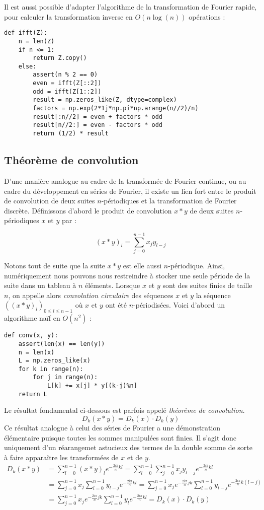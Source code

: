 \documentclass{article}
\begin{document}
Il est aussi possible d'adapter l'algorithme de la transformation de Fourier rapide, pour calculer la transformation inverse en $O(n\log(n))$ opérations :
\begin{verbatim}
def ifft(Z):
    n = len(Z)
    if n <= 1:
        return Z.copy()
    else:
        assert(n % 2 == 0)
        even = ifft(Z[::2])
        odd = ifft(Z[1::2])
        result = np.zeros_like(Z, dtype=complex)
        factors = np.exp(2*1j*np.pi*np.arange(n//2)/n)
        result[:n//2] = even + factors * odd
        result[n//2:] = even - factors * odd
        return (1/2) * result
\end{verbatim}
\subsection{Théorème de convolution}

D'une manière analogue au cadre de la transformée de Fourier continue, ou au cadre du développement en séries de Fourier, il existe un lien fort entre le produit de convolution de deux suites $n$-périodiques et la transformation de Fourier discrète. Définissons d'abord le produit de convolution $x*y$ de deux suites $n$-périodiques $x$ et $y$ par :

$$(x*y)_l = \sum_{j=0}^{n-1}x_j y_{l-j}$$

Notons tout de suite que la suite $x*y$ est elle aussi $n$-périodique. Ainsi, numériquement nous pouvons nous restreindre à stocker une seule période de la suite dans un tableau à $n$ éléments.   
Lorsque $x$ et $y$ sont des suites finies de taille $n$, on appelle alors \emph{convolution circulaire} des séquences $x$ et $y$ la séquence $((x*y)_l)_{0 \le l \le n-1}$ où $x$ et $y$ ont été $n$-périodisées. Voici d'abord un algorithme naïf en $O(n^2)$ :
\begin{verbatim}
def conv(x, y):
    assert(len(x) == len(y))
    n = len(x)
    L = np.zeros_like(x)
    for k in range(n):
        for j in range(n):
            L[k] += x[j] * y[(k-j)%n]
    return L
\end{verbatim}

Le résultat fondamental ci-dessous est parfois appelé \emph{théorème de convolution}.
\begin{equation}
  \label{conv}
  D_k(x*y) = D_k(x) \cdot D_k(y)
\end{equation}
Ce résultat analogue à celui des séries de Fourier a une démonstration élémentaire puisque toutes les sommes manipulées sont finies. 
Il s'agit donc uniquement d'un réarangemet astucieux des termes de la double somme de sorte à faire apparaître les transformées de $x$ et de $y$.
\begin{align*}
  D_k(x*y) 
  &=\sum_{l=0}^{n-1} (x * y)_l e^{-\frac{2i\pi}{n}kl}
  = \sum_{l=0}^{n-1} \sum_{j=0}^{n-1}x_j y_{l-j} e^{-\frac{2i\pi}{n}kl}\\
  &=\sum_{j=0}^{n-1} x_j \sum_{l=0}^{n-1}y_{l-j} e^{-\frac{2i\pi}{n}kl}
  = \sum_{j=0}^{n-1} x_j e^{-\frac{2i\pi}{n} j k} \sum_{l=0}^{n-1}y_{l-j} e^{-\frac{2i\pi}{n}k(l-j)}\\
  &=\sum_{j=0}^{n-1} x_j e^{-\frac{2i\pi}{n} j k} \sum_{l=0}^{n-1}y_{l} e^{-\frac{2i\pi}{n}kl}
  = D_k(x)\cdot D_k(y)\\
\end{align*}
\end{document}
